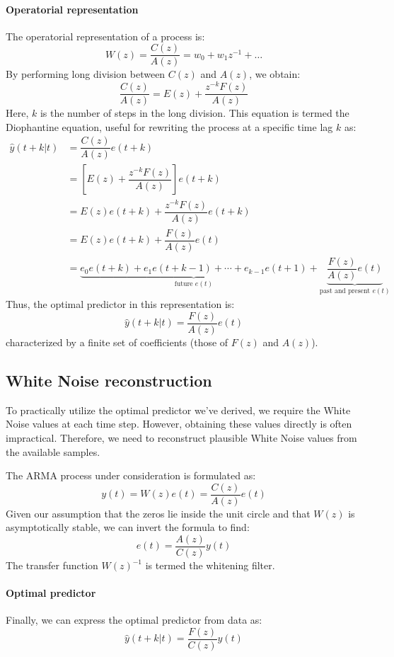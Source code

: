 \paragraph*{Operatorial representation}
The operatorial representation of a process is:
\[W(z)=\dfrac{C(z)}{A(z)}=w_0+w_1z^{-1}+\dots\]
By performing long division between $C(z)$ and $A(z)$, we obtain:
\[\dfrac{C(z)}{A(z)}=E(z)+\dfrac{z^{-k}F(z)}{A(z)}\]
Here, $k$ is the number of steps in the long division.
This equation is termed the Diophantine equation, useful for rewriting the process at a specific time lag $k$ as:
\begin{align*}
    \hat{y}(t+k|t)  &=\dfrac{C(z)}{A(z)}e(t+k) \\
            &=\left[E(z)+\dfrac{z^{-k}F(z)}{A(z)}\right]e(t+k) \\
            &=E(z)e(t+k)+\dfrac{z^{-k}F(z)}{A(z)}e(t+k) \\
            &=E(z)e(t+k)+\dfrac{F(z)}{A(z)}e(t) \\
            &=\underbrace{e_0e(t+k)+e_1e(t+k-1)+\cdots+e_{k-1}e(t+1)}_{\text{future } e(t)} +\underbrace{\dfrac{F(z)}{A(z)}e(t)}_{\text{past and present } e(t)} 
\end{align*}
Thus, the optimal predictor in this representation is:
\[\hat{y}(t+k|t)=\dfrac{F(z)}{A(z)}e(t)\]
characterized by a finite set of coefficients (those of $F(z)$ and $A(z)$).

\subsection{ White Noise reconstruction}
To practically utilize the optimal predictor we've derived, we require the  White Noise values at each time step. However, obtaining these values directly is often impractical. 
Therefore, we need to reconstruct plausible  White Noise values from the available samples.

The ARMA process under consideration is formulated as:
\[y(t)=W(z)e(t)=\dfrac{C(z)}{A(z)}e(t)\]
Given our assumption that the zeros lie inside the unit circle and that $W(z)$ is asymptotically stable, we can invert the formula to find:
\[e(t)=\dfrac{A(z)}{C(z)}y(t)\]
The transfer function ${W(z)}^{-1}$ is termed the whitening filter.

\paragraph*{Optimal predictor}
Finally, we can express the optimal predictor from data as:
\[\hat{y}(t+k|t)=\dfrac{F(z)}{C(z)}y(t)\]


